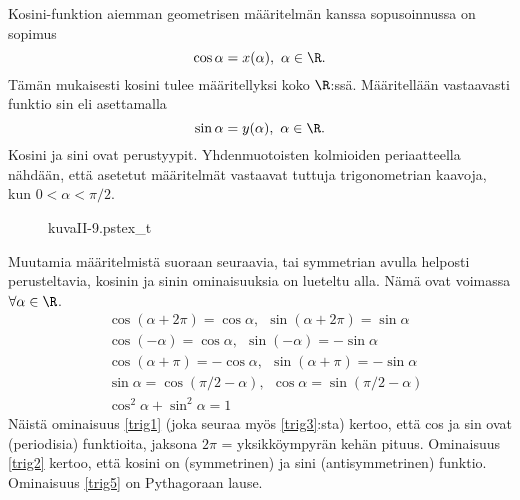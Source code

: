 Kosini-funktion aiemman geometrisen määritelmän kanssa sopusoinnussa on sopimus
\[
\cos\alpha = x(\alpha), \ \alpha \in \R.
\]
Tämän mukaisesti kosini tulee määritellyksi koko $\R$:ssä. Määritellään vastaavasti funktio sin
eli  asettamalla
\[
\sin\alpha = y(\alpha), \ \alpha \in \R. 
\]
Kosini ja sini ovat  perustyypit. Yhdenmuotoisten kolmioiden 
periaatteella nähdään, että asetetut määritelmät vastaavat tuttuja trigonometrian kaavoja, kun 
$0 < \alpha < \pi/2$.
\begin{figure}[H]
\begin{center}
{kuvaII-9.pstex_t}
\end{center}
\end{figure}
Muutamia määritelmistä suoraan seuraavia, tai symmetrian avulla helposti perusteltavia, kosinin
ja sinin ominaisuuksia on lueteltu alla. Nämä ovat voimassa $\forall \alpha \in \R$.
\begin{align}
&\cos(\alpha + 2 \pi) = \cos\alpha, \ \ \sin(\alpha + 2 \pi) = \sin\alpha \label{trig1} \\
&\cos(-\alpha) = \cos\alpha, \ \ \sin(-\alpha) = -\sin\alpha \label{trig2} \\
&\cos(\alpha + \pi) = -\cos\alpha, \ \ \sin(\alpha + \pi) = -\sin\alpha \label{trig3} \\ 
&\sin\alpha = \cos(\pi/2 - \alpha), \ \ \cos\alpha = \sin(\pi/2 - \alpha) \label{trig4} \\
&\cos^2 \alpha + \sin^2 \alpha = 1 \label{trig5}
\end{align}
Näistä ominaisuus \eqref{trig1} (joka seuraa myös \eqref{trig3}:sta) kertoo, että cos ja sin ovat
 (periodisia) funktioita, jaksona $2\pi$ = yksikköympyrän kehän pituus. 
Ominaisuus \eqref{trig2} kertoo, että kosini on  (symmetrinen) ja sini 
 (antisymmetrinen) funktio. Ominaisuus \eqref{trig5} on Pythagoraan lause.
